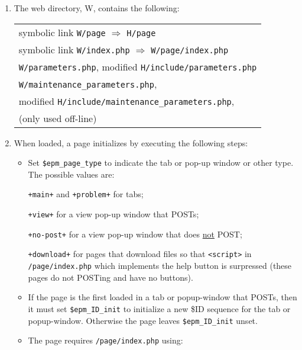 \documentclass[12pt]{article}
\newcommand{\EOL}{\penalty \exhyphenpenalty}
\begin{document}
\begin{enumerate}
\item The web directory, W, contains the following:

  \hspace*{0.2in}\begin{tabular}{l}
      symbolic link {\tt W/page} $\Longrightarrow$ {\tt H/page} \\
      symbolic link {\tt W/index.php}
          $\Longrightarrow$ {\tt W/page/index.php} \\
      {\tt W/parameters.php}, modified {\tt H/include/parameters.php} \\
      {\tt W/maintenance\_parameters.php}, \\
      \hspace*{0.2in}modified {\tt H/include/maintenance\_parameters.php}, \\
      \hspace*{0.2in}(only used off-line) \\
      \end{tabular}

\item When loaded, a page initializes by executing the following steps:
\begin{itemize}
\item Set {\tt \$epm\_page\_type} to indicate the tab or pop-up window
      or other type.  The possible values are:
      
      {\tt +main+} and {\tt +problem+} for tabs;
      
      {\tt +view+} for a view pop-up window that POSTs;
      
      {\tt +no-post+} for a view pop-up window that does \underline{not}
      POST;
      
      {\tt +download+} for pages that download files
      so that {\tt <script>}
      in {\tt /page/\EOL index.php} which implements the help button
      is surpressed (these pages do not POSTing and have
      no buttons).

\item If the page is the first loaded in a tab or popup-window that POSTs,
      then it must set {\tt \$epm\_ID\_init} to initialize a new
      \$ID sequence for the tab or popup-window.  Otherwise the page
      leaves {\tt \$epm\_ID\_init} unset.

\item The page requires {\tt /page/index.php} using:

      \hspace*{0.2in}{\tt require \_\_DIR\_\_ . '/index.php'}
      

\end{itemize}
\end{enumerate}
\end{document}
